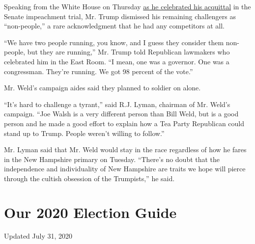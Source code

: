 Speaking from the White House on Thursday
\href{https://www.nytimes.com/2020/02/06/us/politics/trump-impeachment.html}{as
he celebrated his acquittal} in the Senate impeachment trial, Mr. Trump
dismissed his remaining challengers as ``non-people,'' a rare
acknowledgment that he had any competitors at all.

``We have two people running, you know, and I guess they consider them
non-people, but they are running,'' Mr. Trump told Republican lawmakers
who celebrated him in the East Room. ``I mean, one was a governor. One
was a congressman. They're running. We got 98 percent of the vote.''

Mr. Weld's campaign aides said they planned to soldier on alone.

``It's hard to challenge a tyrant,'' said R.J. Lyman, chairman of Mr.
Weld's campaign. ``Joe Walsh is a very different person than Bill Weld,
but is a good person and he made a good effort to explain how a Tea
Party Republican could stand up to Trump. People weren't willing to
follow.''

Mr. Lyman said that Mr. Weld would stay in the race regardless of how he
fares in the New Hampshire primary on Tuesday. ``There's no doubt that
the independence and individuality of New Hampshire are traits we hope
will pierce through the cultish obsession of the Trumpists,'' he said.

\hypertarget{our-2020-election-guide}{%
\section{Our 2020 Election Guide}\label{our-2020-election-guide}}

Updated July 31, 2020

